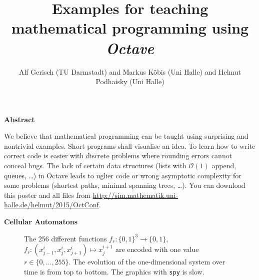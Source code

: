 \documentclass{beamer}
\title{Examples for teaching mathematical programming 
   using \emph{Octave}}
\author{Alf Gerisch (TU Darmstadt) and 
   Markus Köbis (Uni Halle) and Helmut Podhaisky (Uni Halle)}
\date{} %
\def\sect#1{\textbf{\color{blue} #1}}
\begin{document}
\begin{frame}[t]{}
\begin{multicols}{5}
\sect{Abstract}

We believe that mathematical programming can be taught using surprising and
nontrivial examples. Short programs shall visualise an idea.  To learn how to
write correct code is easier with discrete problems where rounding errors
cannot conceal bugs.  The lack of certain data structures (lists with
$\mathcal{O}(1)$ append, queues, \dots) in Octave leads to uglier code or wrong
asymptotic complexity for some problems (shortest paths, minimal spanning
trees, \dots). You can download this poster and all files from
\url{http://sim.mathematik.uni-halle.de/helmut/2015/OctConf}.

\medskip 

\sect{Cellular Automatons}

\begin{figure}
\caption{The 256 different functions $f_r\colon\{0,1\}^3\to\{0,1\}$, $f_r\colon (x^{i}_{j-1},x^{i}_j,x^{i}_{j+1})\mapsto x^{i+1}_j$
are encoded with one value $r\in \{0,\dots,255\}$.
The evolution of the one-dimensional system over time is from top to bottom. 
The graphics with \texttt{spy} is slow.}
\end{figure}


\end{multicols}
\end{frame}
\end{document}
